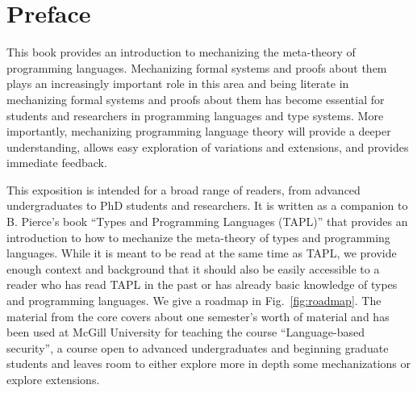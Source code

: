 \chapter*{Preface}
This book provides an introduction to mechanizing the meta-theory of programming languages. Mechanizing formal systems and proofs about them plays an increasingly important role in this area and being literate in mechanizing formal systems and proofs about them  has become essential for students and researchers in programming languages and type systems. More importantly, mechanizing programming language theory will provide a deeper understanding, allows easy  exploration of variations and extensions, and provides immediate feedback.

This exposition is intended for a broad range of readers, from
advanced undergraduates to PhD students and researchers.  It is
written as a companion to B. Pierce's book ``Types and Programming
Languages (TAPL)'' that provides an introduction to how to mechanize
the meta-theory of types and programming languages. While it is meant
to be read  at the same time as TAPL, we provide enough context and
background that it should also be easily accessible to a reader who
has read TAPL in the past or has already basic knowledge of types and
programming languages. We give a roadmap in Fig.~\ref{fig:roadmap}. The material from the core covers about one semester's worth of material and has been used at McGill University for teaching the course ``Language-based security'', a course open to advanced undergraduates and beginning graduate students and leaves room to either explore more in depth some mechanizations or explore extensions.



